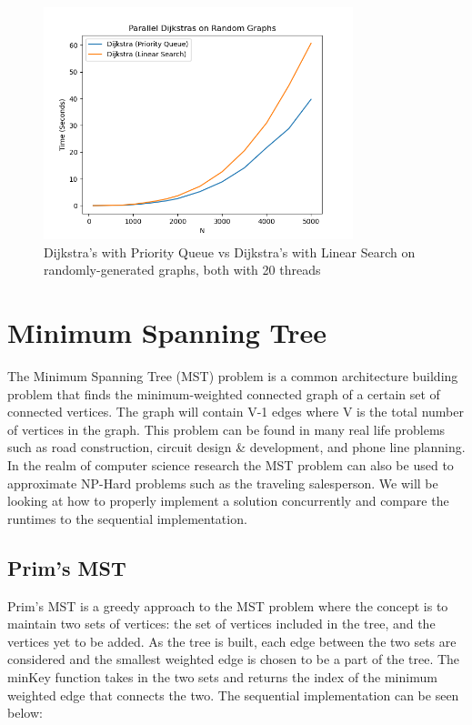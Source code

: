 \documentclass[conference]{IEEEtran}
\begin{document}
\begin{figure}[t]
    
\end{figure}



\begin{figure}[t]
    \centering
    \includegraphics[width=9cm]{images/benchdijkstra.png}
    \caption{Dijkstra's with Priority Queue vs Dijkstra's with Linear Search on randomly-generated graphs, both with 20 threads}
    \label{fig:dijkstra_both}
\end{figure}

\break
\newpage

\section{Minimum Spanning Tree}
The Minimum Spanning Tree (MST) problem is a common architecture building problem that finds the minimum-weighted connected graph of a certain set of connected vertices. The graph will contain V-1 edges where V is the total number of vertices in the graph. This problem can be found in many real life problems such as road construction, circuit design & development, and phone line planning. In the realm of computer science research the MST problem can also be used to approximate NP-Hard problems such as the traveling salesperson. We will be looking at how to properly implement a solution concurrently and compare the runtimes to the sequential implementation.

\subsection{Prim's MST}
Prim's MST is a greedy approach to the MST problem where the concept is to maintain two sets of vertices: the set of vertices included in the tree, and the vertices yet to be added. As the tree is built, each edge between the two sets are considered and the smallest weighted edge is chosen to be a part of the tree. The minKey function takes in the two sets and returns the index of the minimum weighted edge that connects the two. The sequential implementation can be seen below:
\end{document}
